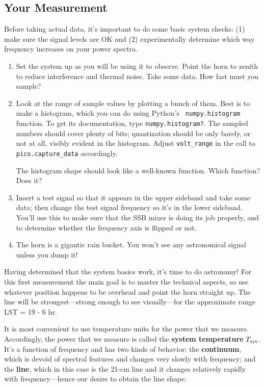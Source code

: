 \documentclass[12pt,preprint]{aastex}
\begin{document}
\subsection{Your Measurement}

Before taking actual data, it's important to do some basic system
checks: (1) make sure the signal levels are OK and (2) experimentally
determine which way frequency increases on your power spectra.
\begin{enumerate}

\item Set the system up as you will be using it to observe. Point the
  horn to zenith to reduce interference and thermal noise.  Take some
data.  How fast must you sample? 

\item Look at the range of sample values by plotting a bunch of
  them. Best is to make a histogram, which you can do using Python's {\tt
    numpy.histogram} function.  
      To get its documentation,
    type {\tt numpy.histogram?}.
    The sampled numbers should cover plenty of bits;
  quantization should be only barely, or not at all, visibly evident in
  the histogram. Adjust {\tt volt\_range} in the call to {\tt pico.capture\_data}
  accordingly.

The
  histogram shape should look like a well-known function. Which
  function? Does it?

\item Insert a test signal so that it appears in the upper sideband and
take some data; then change the test signal frequency so it's in the
lower sideband.  You'll use this to make sure that the SSB mixer is
doing its job properly, and to determine whether the frequency axis
is flipped or not.

\item The horn is a gigantic rain bucket. You won't see any
  astronomical signal unless you dump it!

\end{enumerate}

Having determined that the system basics work, it's time to do
astronomy! For this first measurement the main goal is to master the
technical aspects, so use whatever position happens to be overhead and
point the horn straight up. The line will be strongest---strong enough
to see visually---for the approximate range LST = 19 - 6 hr.

It is most convenient to use temperature units for the power
that we measure. Accordingly, the power that we measure is called the
{\bf system temperature} $T_{\rm sys}$. It's a function of frequency and has two
kinds of behavior: the {\bf continuum}, which is devoid of spectral features
and changes very slowly with frequency; and the {\bf line}, which in this
case is the 21-cm line and it changes relatively rapidly with frequency---hence our
desire to obtain the line shape.
\end{document}
